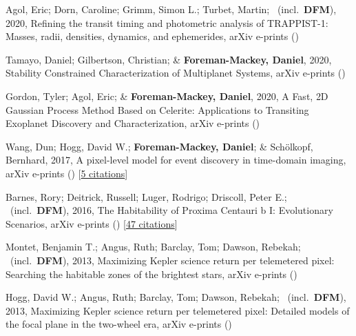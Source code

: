 \item[{\color{numcolor}\scriptsize7}] Agol, Eric; Dorn, Caroline; Grimm, Simon L.; Turbet, Martin; \etal\ (incl.\ \textbf{DFM}), 2020, Refining the transit timing and photometric analysis of TRAPPIST-1: Masses, radii, densities, dynamics, and ephemerides, arXiv e-prints ()

\item[{\color{numcolor}\scriptsize6}] Tamayo, Daniel; Gilbertson, Christian; \& \textbf{Foreman-Mackey, Daniel}, 2020, Stability Constrained Characterization of Multiplanet Systems, arXiv e-prints ()

\item[{\color{numcolor}\scriptsize5}] Gordon, Tyler; Agol, Eric; \& \textbf{Foreman-Mackey, Daniel}, 2020, A Fast, 2D Gaussian Process Method Based on Celerite: Applications to Transiting Exoplanet Discovery and Characterization, arXiv e-prints ()

\item[{\color{numcolor}\scriptsize4}] Wang, Dun; Hogg, David W.; \textbf{Foreman-Mackey, Daniel}; \& Sch{\"o}lkopf, Bernhard, 2017, A pixel-level model for event discovery in time-domain imaging, arXiv e-prints () [\href{https://ui.adsabs.harvard.edu/abs/2017arXiv171002428W}{5 citations}]

\item[{\color{numcolor}\scriptsize3}] Barnes, Rory; Deitrick, Russell; Luger, Rodrigo; Driscoll, Peter E.; \etal\ (incl.\ \textbf{DFM}), 2016, The Habitability of Proxima Centauri b I: Evolutionary Scenarios, arXiv e-prints () [\href{https://ui.adsabs.harvard.edu/abs/2016arXiv160806919B}{47 citations}]

\item[{\color{numcolor}\scriptsize2}] Montet, Benjamin T.; Angus, Ruth; Barclay, Tom; Dawson, Rebekah; \etal\ (incl.\ \textbf{DFM}), 2013, Maximizing Kepler science return per telemetered pixel: Searching the habitable zones of the brightest stars, arXiv e-prints ()

\item[{\color{numcolor}\scriptsize1}] Hogg, David W.; Angus, Ruth; Barclay, Tom; Dawson, Rebekah; \etal\ (incl.\ \textbf{DFM}), 2013, Maximizing Kepler science return per telemetered pixel: Detailed models of the focal plane in the two-wheel era, arXiv e-prints ()
